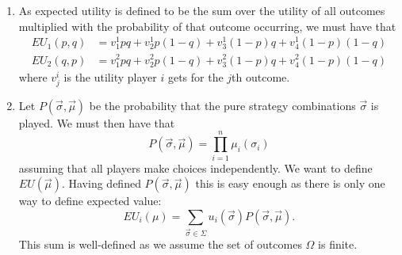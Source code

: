 \documentclass[a4paper]{article}
\begin{document}
\begin{exercise}{2}
  \begin{enumerate}[label=(\alph*)]
    \item As expected utility is defined to be the sum over the utility of all outcomes multiplied with the probability of that outcome occurring, we must have that
      \begin{align*}
        EU_1(p, q) &= v^{1}_1pq + v^{1}_2p(1 - q) + v^{1}_3(1 - p)q + v^{1}_4(1-p)(1-q) \\
        EU_2(q, p) &= v^{2}_1pq + v^{2}_2p(1 - q) + v^{2}_3(1 - p)q + v^{2}_4(1-p)(1-q)
      \end{align*}
      where $ v^{i}_j $ is the utility player $ i $ gets for the $ j $th outcome.

    \item Let $ P(\vec{\sigma}, \vec{\mu}) $ be the probability that the pure strategy combinations $ \vec{\sigma} $ is played. We must then have that
      \begin{equation*}
        P(\vec{\sigma}, \vec{\mu}) = \prod_{i = 1}^{n} \mu_i(\sigma_i)
      \end{equation*}
      assuming that all players make choices independently. We want to define $ EU(\vec{\mu}) $. Having defined $ P(\vec{\sigma}, \vec{\mu}) $ this is easy enough as there is only one way to define expected value:
      \begin{equation*}
        EU_i(\mu) = \sum_{\vec{\sigma} \in \Sigma} u_i(\vec{\sigma}) P(\vec{\sigma}, \vec{\mu})
      .\end{equation*}
      This sum is well-defined as we assume the set of outcomes $ \Omega $ is finite.
  \end{enumerate}
\end{exercise}
\end{document}
